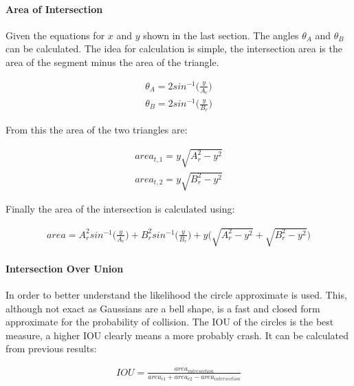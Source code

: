 \documentclass[11pt,twoside]{report}
\begin{document}
\paragraph{Area of Intersection}

Given the equations for $x$ and $y$ shown in the last section. The angles $\theta_{A}$ and $\theta_{B}$ can be calculated. The idea for calculation is simple, the intersection area is the area of the segment minus the area of the triangle.


\begin{equation}
\begin{aligned}
\theta_{A} = 2sin^{-1} \bigg ( \frac{y}{A_{r}} \bigg )
\\
\theta_{B} = 2sin^{-1} \bigg ( \frac{y}{B_{r}} \bigg )
\end{aligned}
\label{circle_area_eq1}
\end{equation}

From this the area of the two triangles are:

\begin{equation}
\begin{aligned}
area_{t,1} = y \sqrt{A_{r}^{2} - y^{2}} \\
area_{t,2} = y \sqrt{B_{r}^{2} - y^{2}}
\end{aligned}
\label{circle_area_eq1}
\end{equation}


Finally the area of the intersection is calculated using:

\begin{equation}
\begin{aligned}
area = A_{r}^{2}sin^{-1} \big ( \frac{y}{A_{r}}) + B_{r}^{2}sin^{-1} \big ( \frac{y}{B_{r}}) + y \bigg ( \sqrt{A_{r}^{2} - y^{2}} + \sqrt{B_{r}^{2} - y^{2}} \bigg )
\end{aligned}
\label{circle_area_eq1}
\end{equation}

\paragraph{Intersection Over Union}
In order to better understand the likelihood the circle approximate is used. This, although not exact as Gaussians are a bell shape, is a fast and closed form approximate for the probability of collision. The IOU of the circles is the best measure, a higher IOU clearly means a more probably crash. It can be calculated from previous results:


\begin{equation}
\begin{aligned}
IOU = \frac{area_{intersection}}{ area_{c1} + area_{c2} - area_{intersection}}
\end{aligned}
\label{circle_area_eq1}
\end{equation}
\end{document}
